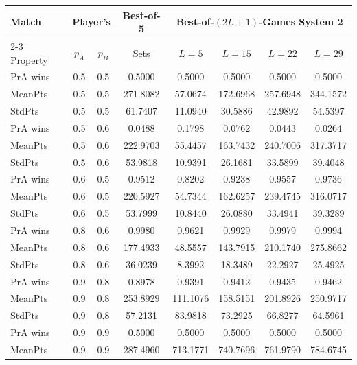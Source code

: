 \documentclass[11pt]{article}
\theoremstyle{plain}
\theoremstyle{definition}
\begin{document}
\begin{table}[h]
\begin{center}
\begin{tabular}{||l||c|c||c||c|c|c|c||} \hline\hline
Match &\multicolumn{2}{c||}{Player's}& Best-of-5& \multicolumn{4}{c||}{Best-of-$(2L+1)$-Games System 2} \\
\cline{2-3} \cline{5-8}
   Property  &  $p_A$ & $p_B$  & Sets & $L=5$ & $L=15$ & $L=22$ & $L=29$ \\ \hline\hline
PrA wins & 0.5 & 0.5 &  0.5000  &   0.5000   &   0.5000  &    0.5000  &    0.5000 \\
MeanPts  &   0.5 & 0.5 & 271.8082  &  57.0674  &  172.6968  &  257.6948  &  344.1572 \\
StdPts  &    0.5 & 0.5 & 61.7407 &   11.0940  &   30.5886  &   42.9892  &   54.5397 \\ \hline
PrA wins & 0.5 & 0.6 &  0.0488  &   0.1798  &    0.0762  &    0.0443  &    0.0264 \\
MeanPts   &  0.5 & 0.6 & 222.9703  &  55.4457  &  163.7432  &  240.7006  &  317.3717 \\
StdPts   &   0.5 & 0.6 & 53.9818 &   10.9391  &   26.1681   &  33.5899   &  39.4048 \\ \hline
PrA wins & 0.6 & 0.5 &  0.9512 &    0.8202  &    0.9238  &    0.9557   &   0.9736 \\
MeanPts  &   0.6 & 0.5 & 220.5927 &   54.7344  &  162.6257  &  239.4745  &  316.0717 \\
StdPts   &   0.6 & 0.5 & 53.7999  &  10.8440   &  26.0880  &   33.4941  &   39.3289 \\ \hline
PrA wins & 0.8 & 0.6 &  0.9980 &    0.9621 &     0.9929 &     0.9979  &    0.9994 \\
MeanPts  &   0.8 & 0.6 & 177.4933 &   48.5557  &  143.7915 &   210.1740  &  275.8662 \\
StdPts    &  0.8 & 0.6 & 36.0239  &   8.3992  &   18.3489  &   22.2927   &  25.4925 \\ \hline
PrA wins & 0.9 & 0.8 &   0.8978  &   0.9391  &    0.9412  &    0.9435  &    0.9462 \\
MeanPts &    0.9 & 0.8 & 253.8929 &  111.1076  &  158.5151 &   201.8926  &  250.9717 \\
StdPts  &    0.9 & 0.8 &  57.2131  &  83.9818  &   73.2925  &   66.8277   &  64.5961 \\ \hline
PrA wins & 0.9 & 0.9  & 0.5000 &    0.5000   &   0.5000  &    0.5000  &    0.5000 \\
MeanPts  &   0.9 & 0.9 & 287.4960  & 713.1771  &  740.7696 &   761.9790  &  784.6745 \\

\end{tabular}
\end{center}
\end{table}
\end{document}
